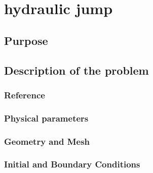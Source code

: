 \chapter{hydraulic jump}
%

%
\section{Purpose}
%

%
\section{Description of the problem}
%

%
%
\subsection{Reference}
%

%
%
\subsection{Physical parameters}
%

%
%
\subsection{Geometry and Mesh}
%

%
%
\subsection{Initial and Boundary Conditions}
%

%
%
